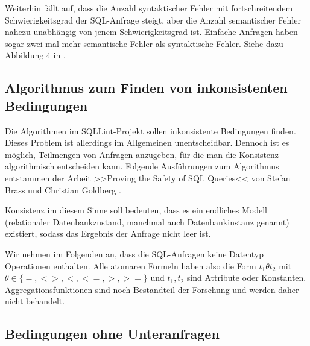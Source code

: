 Weiterhin fällt auf, dass die Anzahl syntaktischer Fehler mit fortschreitendem Schwierigkeitsgrad der SQL-Anfrage steigt, aber die Anzahl semantischer Fehler nahezu unabhängig von jenem Schwierigkeitsgrad ist. Einfache Anfragen haben sogar zwei mal mehr semantische Fehler als syntaktische Fehler. Siehe dazu Abbildung 4 in \cite{sqllint1}.

\subsection{Algorithmus zum Finden von inkonsistenten Bedingungen}

Die Algorithmen im SQLLint-Projekt sollen inkonsistente Bedingungen finden. Dieses Problem ist allerdings im Allgemeinen unentscheidbar. Dennoch ist es möglich, Teilmengen von Anfragen anzugeben, für die man die Konsistenz algorithmisch entscheiden kann. Folgende Ausführungen zum Algorithmus entstammen der Arbeit >>Proving the Safety of SQL Queries<< von Stefan Brass und Christian Goldberg \cite{brass1}.

Konsistenz im diesem Sinne soll bedeuten, dass es ein endliches Modell (relationaler Datenbankzustand, manchmal auch Datenbankinstanz genannt) existiert, sodass das Ergebnis der Anfrage nicht leer ist.

Wir nehmen im Folgenden an, dass die SQL-Anfragen keine Datentyp Operationen enthalten. Alle atomaren Formeln haben also die Form $t_1\theta t_2$ mit $\theta\in \{=,<>,<,<=,>,>=\}$ und $t_1,t_2$ sind Attribute oder Konstanten. Aggregationsfunktionen sind noch Bestandteil der Forschung und werden daher nicht behandelt.

\subsection{Bedingungen ohne Unteranfragen}

